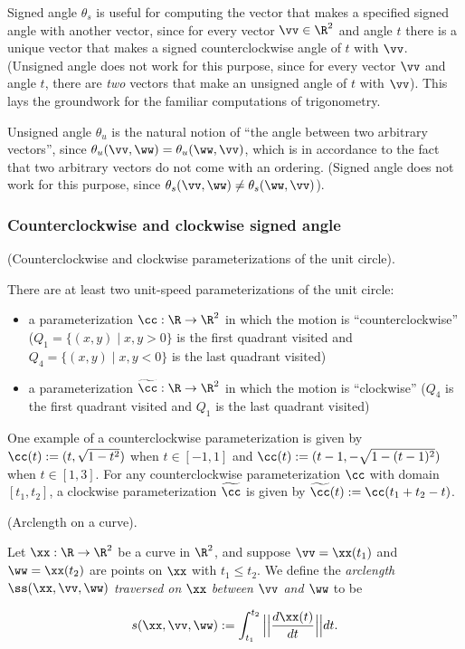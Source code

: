 Signed angle $\theta_s$ is useful for computing the vector that makes a specified signed angle with another vector, since for every vector $\vv \in \R^2$ and angle $t$ there is a unique vector that makes a signed counterclockwise angle of $t$ with $\vv$. (Unsigned angle does not work for this purpose, since for every vector $\vv$ and angle $t$, there are \textit{two} vectors that make an unsigned angle of $t$ with $\vv$). This lays the groundwork for the familiar computations of trigonometry.

Unsigned angle $\theta_u$ is the natural notion of ``the angle between two arbitrary vectors'', since $\theta_u(\vv, \ww) = \theta_u(\ww, \vv)$, which is in accordance to the fact that two arbitrary vectors do not come with an ordering. (Signed angle does not work for this purpose, since $\theta_s(\vv, \ww) \neq \theta_s(\ww, \vv)$).

\subsubsection*{Counterclockwise and clockwise signed angle}

\begin{defn}
    (Counterclockwise and clockwise parameterizations of the unit circle).

    There are at least two unit-speed parameterizations of the unit circle:
    
    \begin{itemize}
        \item a parameterization $\cc:\R \rightarrow \R^2$ in which the motion is ``counterclockwise'' ($Q_1 = \{(x, y) \mid x, y > 0\}$ is the first quadrant visited and $Q_4 = \{(x, y) \mid x, y < 0\}$ is the last quadrant visited)
        \item a parameterization $\widetilde{\cc}:\R \rightarrow \R^2$ in which the motion is ``clockwise'' ($Q_4$ is the first quadrant visited and $Q_1$ is the last quadrant visited)
    \end{itemize}

    One example of a counterclockwise parameterization is given by $\cc(t) := (t, \sqrt{1 - t^2})$ when $t \in [-1, 1]$ and $\cc(t) := (t - 1, -\sqrt{1 - (t - 1)^2})$ when $t \in [1, 3]$. For any counterclockwise parameterization $\cc$ with domain $[t_1, t_2]$, a clockwise parameterization $\widetilde{\cc}$ is given by $\widetilde{\cc}(t) := \cc(t_1 + t_2 - t)$.
\end{defn}

\begin{defn}
    (Arclength on a curve).

    Let $\xx:\R \rightarrow \R^2$ be a curve in $\R^2$, and suppose $\vv = \xx(t_1)$ and $\ww = \xx(t_2)$ are points on $\xx$ with $t_1 \leq t_2$. We define the \textit{arclength $\ss(\xx, \vv, \ww)$ traversed on $\xx$ between $\vv$ and $\ww$} to be
    
    \begin{align*}
        s(\xx, \vv, \ww) :=  \int_{t_1}^{t_2} \Big|\Big|\frac{d\xx(t)}{dt}\Big|\Big| dt.
    \end{align*}
\end{defn}

